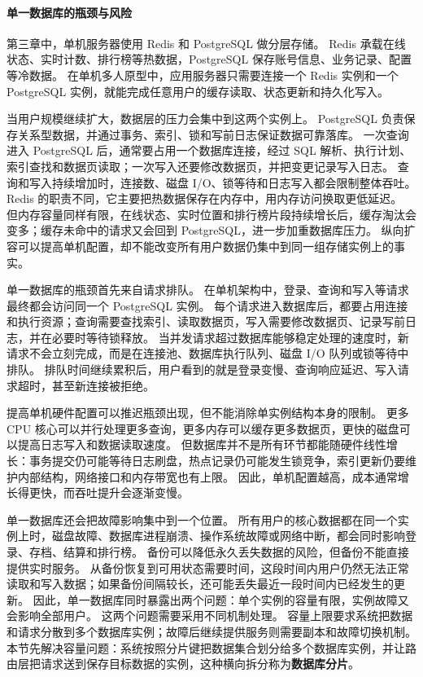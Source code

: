\paragraph{单一数据库的瓶颈与风险}\label{sec4:single-database-bottleneck}

第三章中，单机服务器使用 Redis 和 PostgreSQL 做分层存储。
Redis 承载在线状态、实时计数、排行榜等热数据，PostgreSQL 保存账号信息、业务记录、配置等冷数据。
在单机多人原型中，应用服务器只需要连接一个 Redis 实例和一个 PostgreSQL 实例，就能完成任意用户的缓存读取、状态更新和持久化写入。

当用户规模继续扩大，数据层的压力会集中到这两个实例上。
PostgreSQL 负责保存关系型数据，并通过事务、索引、锁和写前日志保证数据可靠落库。
一次查询进入 PostgreSQL 后，通常要占用一个数据库连接，经过 SQL 解析、执行计划、索引查找和数据页读取；一次写入还要修改数据页，并把变更记录写入日志。
查询和写入持续增加时，连接数、磁盘 I/O、锁等待和日志写入都会限制整体吞吐。
Redis 的职责不同，它主要把热数据保存在内存中，用内存访问换取更低延迟。
但内存容量同样有限，在线状态、实时位置和排行榜片段持续增长后，缓存淘汰会变多；缓存未命中的请求又会回到 PostgreSQL，进一步加重数据库压力。
纵向扩容可以提高单机配置，却不能改变所有用户数据仍集中到同一组存储实例上的事实。

单一数据库的瓶颈首先来自请求排队。
在单机架构中，登录、查询和写入等请求最终都会访问同一个 PostgreSQL 实例。
每个请求进入数据库后，都要占用连接和执行资源；查询需要查找索引、读取数据页，写入需要修改数据页、记录写前日志，并在必要时等待锁释放。
当并发请求超过数据库能够稳定处理的速度时，新请求不会立刻完成，而是在连接池、数据库执行队列、磁盘 I/O 队列或锁等待中排队。
排队时间继续累积后，用户看到的就是登录变慢、查询响应延迟、写入请求超时，甚至新连接被拒绝。

提高单机硬件配置可以推迟瓶颈出现，但不能消除单实例结构本身的限制。
更多 CPU 核心可以并行处理更多查询，更多内存可以缓存更多数据页，更快的磁盘可以提高日志写入和数据读取速度。
但数据库并不是所有环节都能随硬件线性增长：事务提交仍可能等待日志刷盘，热点记录仍可能发生锁竞争，索引更新仍要维护内部结构，网络接口和内存带宽也有上限。
因此，单机配置越高，成本通常增长得更快，而吞吐提升会逐渐变慢。

单一数据库还会把故障影响集中到一个位置。
所有用户的核心数据都在同一个实例上时，磁盘故障、数据库进程崩溃、操作系统故障或网络中断，都会同时影响登录、存档、结算和排行榜。
备份可以降低永久丢失数据的风险，但备份不能直接提供实时服务。
从备份恢复到可用状态需要时间，这段时间内用户仍然无法正常读取和写入数据；如果备份间隔较长，还可能丢失最近一段时间内已经发生的更新。
因此，单一数据库同时暴露出两个问题：单个实例的容量有限，实例故障又会影响全部用户。
这两个问题需要采用不同机制处理。
容量上限要求系统把数据和请求分散到多个数据库实例；故障后继续提供服务则需要副本和故障切换机制。
本节先解决容量问题：系统按照分片键把数据集合划分给多个数据库实例，并让路由层把请求送到保存目标数据的实例，这种横向拆分称为\textbf{数据库分片}。

